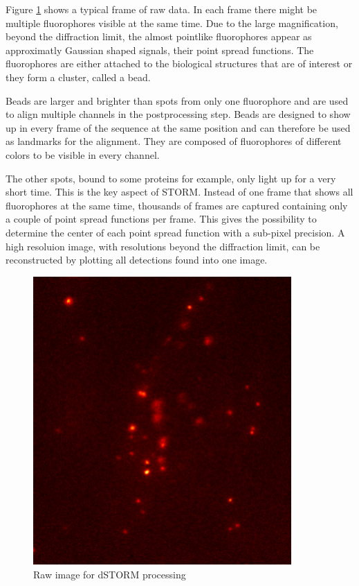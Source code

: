 Figure \ref{rawStorm} shows a typical frame of raw data. In each frame there might be multiple fluorophores visible at the same time. Due to the large magnification, beyond the diffraction limit, the almost pointlike fluorophores appear as approximatly Gaussian shaped signals, their point spread functions. The fluorophores are either attached to the biological structures that are of interest or they form a cluster, called a bead.\newline

Beads are larger and brighter than spots from only one fluorophore and are used to align multiple channels in the postprocessing step. Beads are designed to show up in every frame of the sequence at the same position and can therefore be used as landmarks for the alignment. They are composed of fluorophores of different colors to be visible in every channel.\newline

The other spots, bound to some proteins for example, only light up for a very short time. This is the key aspect of STORM. Instead of one frame that shows all fluorophores at the same time, thousands of frames are captured containing only a couple of point spread functions per frame. This gives the possibility to determine the center of each point spread function with a sub-pixel precision. A high resoluion image, with resolutions beyond the diffraction limit, can be reconstructed by plotting all detections found into one image.

\begin{figure}
\centering
\includegraphics[width = 0.88\textwidth]{pictures/Pos2_2_red2-2frame2475Color.png}
	\caption{Raw image for dSTORM processing}
	\label{rawStorm}
\end{figure}



